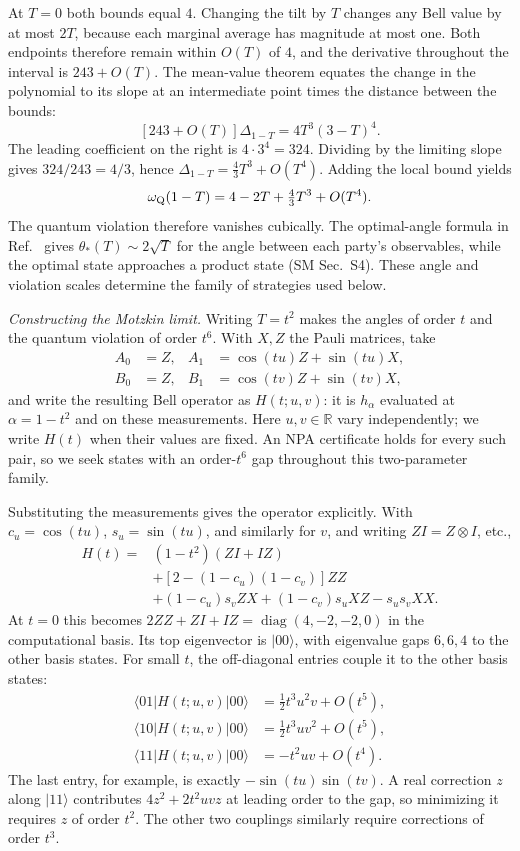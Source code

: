 \documentclass[aps,prl,twocolumn,10pt,superscriptaddress,nofootinbib,longbibliography,nobalancelastpage]{revtex4-2}
\begin{document}
At $T=0$ both bounds equal $4$. Changing the tilt by $T$ changes any Bell value by at most $2T$, because each marginal average has magnitude at most one. Both endpoints therefore remain within $O(T)$ of $4$, and the derivative throughout the interval is $243+O(T)$. The mean-value theorem equates the change in the polynomial to its slope at an intermediate point times the distance between the bounds:
\[
[243+O(T)]\Delta_{1-T}=4T^3(3-T)^4.
\]
The leading coefficient on the right is $4\cdot3^4=324$. Dividing by the limiting slope gives $324/243=4/3$, hence $\Delta_{1-T}=\tfrac43T^3+O(T^4)$. Adding the local bound yields
\begin{equation}
\omega_{\rm Q}(1-T)=4-2T+\tfrac43T^3+O(T^4).
\label{eq:quantum-series}
\end{equation}
The quantum violation therefore vanishes cubically. The optimal-angle formula in Ref.~\cite{GigenaEtAl2025} gives $\theta_*(T)\sim2\sqrt T$ for the angle between each party's observables, while the optimal state approaches a product state (SM Sec.~S4). These angle and violation scales determine the family of strategies used below.

\emph{Constructing the Motzkin limit.} Writing $T=t^2$ makes the angles of order $t$ and the quantum violation of order $t^6$. With $X,Z$ the Pauli matrices, take
\begin{align}
A_0&=Z,& A_1&=\cos(tu)Z+\sin(tu)X,\nonumber\\
B_0&=Z,& B_1&=\cos(tv)Z+\sin(tv)X,
\label{eq:scaled-observables}
\end{align}
and write the resulting Bell operator as $H(t;u,v)$: it is $h_\alpha$ evaluated at $\alpha=1-t^2$ and on these measurements. Here $u,v\in\mathbb R$ vary independently; we write $H(t)$ when their values are fixed. An NPA certificate holds for every such pair, so we seek states with an order-$t^6$ gap throughout this two-parameter family.

Substituting the measurements gives the operator explicitly. With $c_u=\cos(tu)$, $s_u=\sin(tu)$, and similarly for $v$, and writing $ZI=Z\otimes I$, etc.,
\[
\begin{aligned}
H(t)={}&(1-t^2)(ZI+IZ)\\
&+[2-(1-c_u)(1-c_v)]ZZ\\
&+(1-c_u)s_vZX+(1-c_v)s_uXZ-s_us_vXX.
\end{aligned}
\]
At $t=0$ this becomes $2ZZ+ZI+IZ=\operatorname{diag}(4,-2,-2,0)$ in the computational basis. Its top eigenvector is $|00\rangle$, with eigenvalue gaps $6,6,4$ to the other basis states. For small $t$, the off-diagonal entries couple it to the other basis states:
\[
\begin{aligned}
\langle01|H(t;u,v)|00\rangle&=\tfrac12t^3u^2v+O(t^5),\\
\langle10|H(t;u,v)|00\rangle&=\tfrac12t^3uv^2+O(t^5),\\
\langle11|H(t;u,v)|00\rangle&=-t^2uv+O(t^4).
\end{aligned}
\]
The last entry, for example, is exactly $-\sin(tu)\sin(tv)$. A real correction $z$ along $|11\rangle$ contributes $4z^2+2t^2uvz$ at leading order to the gap, so minimizing it requires $z$ of order $t^2$. The other two couplings similarly require corrections of order $t^3$.
\end{document}
